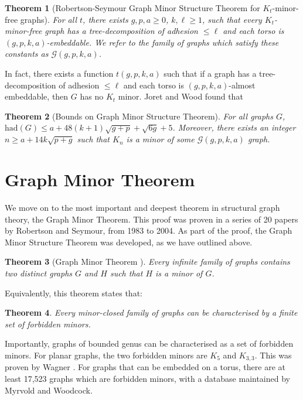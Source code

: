 \documentclass[]{report}
\newcommand{\had}{\text{had}}
\newtheorem{theorem}{Theorem}
\theoremstyle{definition}
\numberwithin{theorem}{section}
\numberwithin{equation}{section}
\begin{document}
\begin{theorem}[Robertson-Seymour Graph Minor Structure Theorem for $K_t$-minor-free graphs]
	For all $t$, there exists $g, p, a \geq 0$, $k, \ell \geq 1$, such that every $K_t$-minor-free graph has a tree-decomposition of adhesion $\leq \ell$ and each torso is $(g, p, k, a)$-embeddable. We refer to the family of graphs which satisfy these constants as $\mathcal{G}(g, p, k, a)$. 
\end{theorem}
In fact, there exists a function $t(g, p, k, a)$ such that if a graph has a tree-decomposition of adhesion $\leq \ell$ and each torso is $(g, p, k, a)$-almost embeddable, then $G$ has no $K_t$ minor. Joret and Wood\cite{joretCompleteGraphMinors2013} found that
\begin{theorem}[Bounds on Graph Minor Structure Theorem\cite{joretCompleteGraphMinors2013}]\label{thm:graph_structure_bound_theorem}
	For all graphs $G$,
	$\had(G) \leq a + 48(k + 1)\sqrt{g + p} + \sqrt{6g} + 5$. Moreover, there exists an integer $n \geq a + 1 4 k\sqrt{p + g}$ such that $K_n$ is a minor of some $\mathcal{G}(g, p, k, a)$ graph.
\end{theorem}

\section{Graph Minor Theorem}\label{sec:Graph Minor Theorem}
We move on to the most important and deepest theorem in structural graph theory, the Graph Minor Theorem. This proof was proven in a series of 20 papers by Robertson and Seymour, from 1983 to 2004. As part of the proof, the Graph Minor Structure Theorem was developed, as we have outlined above. 
\begin{theorem}[Graph Minor Theorem \cite{robertsonGraphMinorsXX2004}]
	Every infinite family of graphs contains two distinct graphs $G$ and $H$ such that $H$ is a minor of $G$.
\end{theorem}
Equivalently, this theorem states that:
\begin{theorem}
	Every minor-closed family of graphs can be characterised by a finite set of forbidden minors.
\end{theorem}
Importantly, graphs of bounded genus can be characterised as a set of forbidden minors.
For planar graphs, the two forbidden minors are $K_5$ and $K_{3,3}$. This was proven by Wagner \cite{wagnerUeberEigenschaftEbenen1937}. 
For graphs that can be embedded on a torus, there are at least 17,523 graphs which are forbidden minors, with a database maintained by Myrvold and Woodcock\cite{myrvoldLargeSetTorus2018}. 
\end{document}
